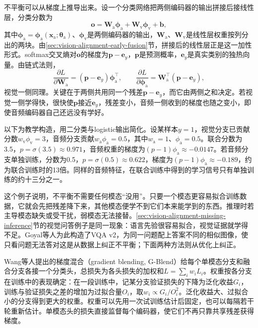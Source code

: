不平衡可以从梯度上推导出来。设一个分类网络把两侧编码器的输出拼接后接线性层，分类分数为
\[
  \bm o=\bm W_{\mathrm a}\bm\phi_{\mathrm a}+\bm W_{\mathrm v}\bm\phi_{\mathrm v}+\bm b,
\]
其中$\bm\phi_{\mathrm a}=\bm\phi_{\mathrm a}(\bm x_{\mathrm a};\bm\theta_{\mathrm a})$、$\bm\phi_{\mathrm v}$是两侧编码器的输出，$\bm W_{\mathrm a}$、$\bm W_{\mathrm v}$是线性层权重按列分出的两块。由\ref{sec:vision-alignment-early-fusion}节，拼接后的线性层正是这一加性形式。softmax交叉熵对$\bm o$的梯度为$\bm p-\bm e_y$，$\bm p$是预测概率，$\bm e_y$是真实类别的独热向量。由链式法则，
\begin{equation}
  \frac{\partial L}{\partial\bm W_{\mathrm a}}=(\bm p-\bm e_y)\bm\phi_{\mathrm a}^\top,\qquad
  \frac{\partial L}{\partial\bm\phi_{\mathrm a}}=\bm W_{\mathrm a}^\top(\bm p-\bm e_y),
  \label{eq:vision-alignment-imbalance-grad}
\end{equation}
视觉一侧同理。关键在于两侧共用同一个残差$\bm p-\bm e_y$，而它由两侧之和决定。若视觉一侧学得快，很快使$\bm p$接近$\bm e_y$，残差变小，音频一侧收到的梯度也随之变小，即使音频编码器自己还远没有学好。

\begin{example}[主导模态压低弱模态的梯度]
  \label{ex:vision-alignment-imbalance}
  以下为教学构造，用二分类与logistic输出简化。设某样本$y=1$，视觉分支已贡献分数$w_{\mathrm v}\phi_{\mathrm v}=3$，音频分支贡献$w_{\mathrm a}\phi_{\mathrm a}=0.5$，其中$w_{\mathrm a}=1$、$\phi_{\mathrm a}=0.5$。联合分数为3.5，$p=\sigma(3.5)\approx0.971$，音频权重的梯度为$(p-1)\phi_{\mathrm a}\approx-0.0147$。若音频分支单独训练，分数为0.5，$p=\sigma(0.5)\approx0.622$，梯度为$(p-1)\phi_{\mathrm a}\approx-0.189$，约为联合训练时的13倍。同样的音频特征，在联合训练中得到的学习信号只有单独训练的约十三分之一。
\end{example}

这个例子说明，不平衡不需要任何模态“没用”。只要一个模态更容易拟合训练数据，它就会先把残差降下来，其他模态便学不到它们本来能学到的东西。推理时若主导模态缺失或受干扰，弱模态无法接替。\ref{sec:vision-alignment-missing-inference}节的视觉问答例子是同一现象：语言先验很容易拟合，视觉证据就学得不足。Goyal等人为此构造了VQA v2，为同一问题配上答案不同的相似图像，使只看问题无法答对这是从数据上纠正不平衡；下面两种方法则从优化上纠正。

Wang等人提出的梯度混合（gradient blending, G-Blend）给每个单模态分支和融合分支各接一个分类头，总损失为各头损失的加权和$L=\sum_i w_iL_i$。权重按各分支在训练中的表现确定：在一段训练中，记某分支验证损失的下降为泛化收益$G_i$，训练与验证损失之差的增加为过拟合量$O_i$，取$w_i\propto G_i/O_i^2$。泛化收益大、过拟合小的分支得到更大的权重。权重可以先用一次试训练估计后固定，也可以每隔若干轮重新估计。单模态头的损失直接监督每个编码器，使它们不再只靠共享残差获得梯度。

